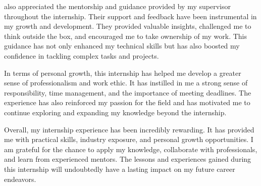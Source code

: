 also appreciated the mentorship and guidance provided by my supervisor throughout the internship. 
Their support and feedback have been instrumental in my growth and development. They provided valuable insights, challenged me to think outside the box, and encouraged me to take ownership of my work. 
This guidance has not only enhanced my technical skills but has also boosted my confidence in tackling complex tasks and projects.

In terms of personal growth, this internship has helped me develop a greater sense of professionalism and work ethic. It has instilled in me a strong sense of responsibility, time management, and the importance of meeting deadlines. 
The experience has also reinforced my passion for the field and has motivated me to continue exploring and expanding my knowledge beyond the internship.

Overall, my internship experience has been incredibly rewarding. It has provided me with practical skills, industry exposure, and personal growth opportunities. 
I am grateful for the chance to apply my knowledge, collaborate with professionals, and learn from experienced mentors. The lessons and experiences gained during this internship will undoubtedly have a lasting impact on my future career endeavors.